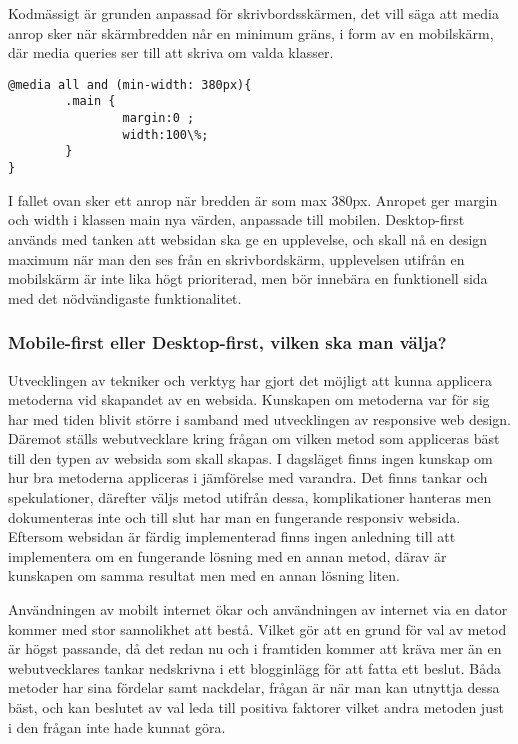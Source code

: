 \documentclass[11pt]{article}
\begin{document}
Kodmässigt är grunden anpassad för skrivbordsskärmen, det vill säga att media anrop sker när skärmbredden når en minimum gräns, i form av en mobilskärm, där media queries ser till att skriva om valda klasser.



 \begin{verbatim}
@media all and (min-width: 380px){
        .main {
                margin:0 ;
                width:100\%;
        }
}
\end{verbatim}

I fallet ovan sker ett anrop när bredden är som max 380px. Anropet ger margin och width i klassen main nya värden, anpassade till mobilen.  Desktop-first används med tanken att websidan ska ge en upplevelse, och skall nå en design maximum när man den ses från en skrivbordskärm, upplevelsen utifrån en mobilskärm är inte lika högt prioriterad, men bör innebära en funktionell sida med det nödvändigaste funktionalitet.

\subsubsection{Mobile-first eller Desktop-first, vilken ska man välja?}
Utvecklingen av tekniker och verktyg har gjort det möjligt att kunna applicera metoderna vid skapandet av en websida. Kunskapen om metoderna var för sig har med tiden blivit större i samband med utvecklingen av responsive web design. Däremot ställs webutvecklare kring frågan om vilken metod som appliceras bäst till den typen av websida som skall skapas. I dagsläget finns ingen kunskap om hur bra metoderna appliceras i jämförelse med varandra. Det finns tankar och spekulationer, därefter väljs metod utifrån dessa, komplikationer hanteras men dokumenteras inte och till slut har man en fungerande responsiv websida. Eftersom websidan är färdig implementerad finns ingen anledning till att implementera om en fungerande lösning med en annan metod, därav är kunskapen om samma resultat men med en annan lösning liten.

Användningen av mobilt internet ökar och användningen av internet via en dator kommer med stor sannolikhet att bestå. Vilket gör att en grund för val av metod är högst passande, då det redan nu och i framtiden kommer att kräva mer än en webutvecklares tankar nedskrivna i ett blogginlägg för att fatta ett beslut. Båda metoder har sina fördelar samt nackdelar, frågan är när man kan utnyttja dessa bäst, och kan beslutet av val leda till positiva faktorer vilket andra metoden just i den frågan inte hade kunnat göra.    
\newpage
\end{document}
